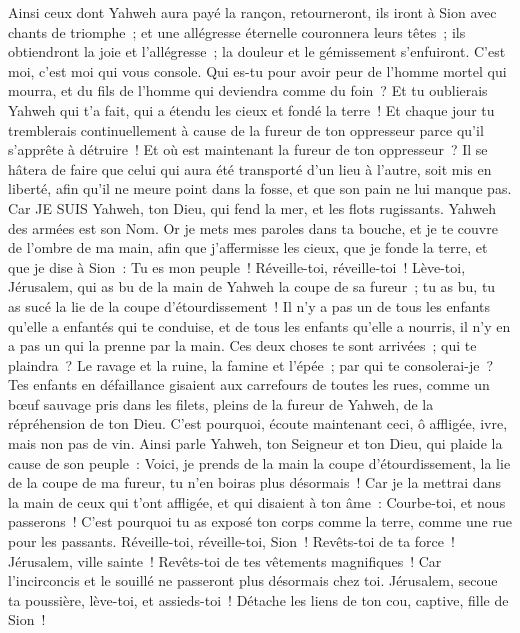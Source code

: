 \begin{multicols}{2}
Ainsi ceux dont Yahweh aura payé la rançon, retourneront, ils iront à Sion avec chants de triomphe~; et une allégresse éternelle couronnera leurs têtes~; ils obtiendront la joie et l'allégresse~; la douleur et le gémissement s'enfuiront.
C'est moi, c'est moi qui vous console. Qui es-tu pour avoir peur de l'homme mortel qui mourra, et du fils de l'homme qui deviendra comme du foin~?
Et tu oublierais Yahweh qui t'a fait, qui a étendu les cieux et fondé la terre~! Et chaque jour tu tremblerais continuellement à cause de la fureur de ton oppresseur parce qu'il s'apprête à détruire~! Et où est maintenant la fureur de ton oppresseur~?
Il se hâtera de faire que celui qui aura été transporté d'un lieu à l'autre, soit mis en liberté, afin qu'il ne meure point dans la fosse, et que son pain ne lui manque pas.
Car JE SUIS Yahweh, ton Dieu, qui fend la mer, et les flots rugissants. Yahweh des armées est son Nom.
Or je mets mes paroles dans ta bouche, et je te couvre de l'ombre de ma main, afin que j'affermisse les cieux, que je fonde la terre, et que je dise à Sion~: Tu es mon peuple~!
Réveille-toi, réveille-toi~! Lève-toi, Jérusalem, qui as bu de la main de Yahweh la coupe de sa fureur~; tu as bu, tu as sucé la lie de la coupe d'étourdissement~!
Il n'y a pas un de tous les enfants qu'elle a enfantés qui te conduise, et de tous les enfants qu'elle a nourris, il n'y en a pas un qui la prenne par la main.
Ces deux choses te sont arrivées~; qui te plaindra~? Le ravage et la ruine, la famine et l'épée~; par qui te consolerai-je~?
Tes enfants en défaillance gisaient aux carrefours de toutes les rues, comme un bœuf sauvage pris dans les filets, pleins de la fureur de Yahweh, de la répréhension de ton Dieu.
C'est pourquoi, écoute maintenant ceci, ô affligée, ivre, mais non pas de vin.
Ainsi parle Yahweh, ton Seigneur et ton Dieu, qui plaide la cause de son peuple~: Voici, je prends de la main la coupe d'étourdissement, la lie de la coupe de ma fureur, tu n'en boiras plus désormais~!
Car je la mettrai dans la main de ceux qui t'ont affligée, et qui disaient à ton âme~: Courbe-toi, et nous passerons~! C'est pourquoi tu as exposé ton corps comme la terre, comme une rue pour les passants.
\VerseOne{}Réveille-toi, réveille-toi, Sion~! Revêts-toi de ta force~! Jérusalem, ville sainte~! Revêts-toi de tes vêtements magnifiques~! Car l'incirconcis et le souillé ne passeront plus désormais chez toi.
Jérusalem, secoue ta poussière, lève-toi, et assieds-toi~! Détache les liens de ton cou, captive, fille de Sion~!

\end{multicols}
